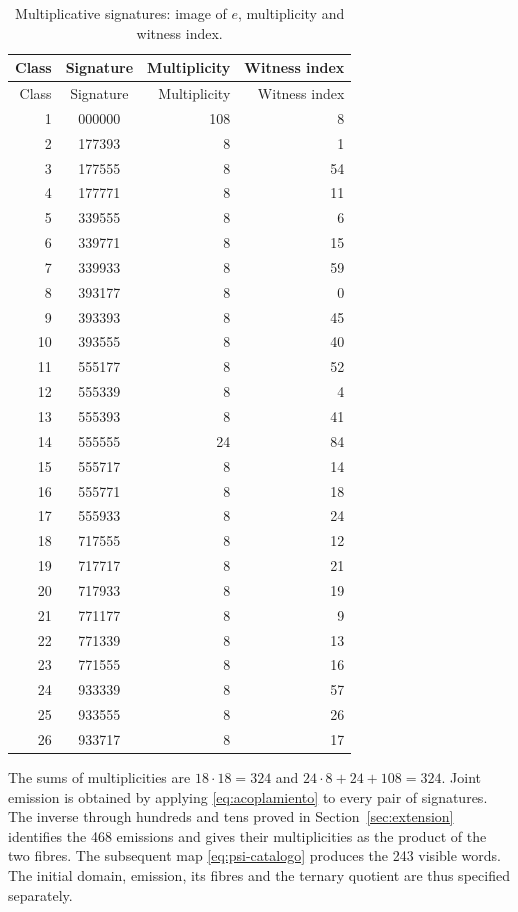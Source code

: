 \begin{longtable}{rcrr}
\caption{Multiplicative signatures: image of \(e\), multiplicity and witness index.}
\label{iv:tabla-firmas-multiplicativas}\\
\toprule
Class & Signature & Multiplicity & Witness index\\
\midrule
\endfirsthead
\toprule
Class & Signature & Multiplicity & Witness index\\
\midrule
\endhead
1&000000&108&8\\
2&177393&8&1\\
3&177555&8&54\\
4&177771&8&11\\
5&339555&8&6\\
6&339771&8&15\\
7&339933&8&59\\
8&393177&8&0\\
9&393393&8&45\\
10&393555&8&40\\
11&555177&8&52\\
12&555339&8&4\\
13&555393&8&41\\
14&555555&24&84\\
15&555717&8&14\\
16&555771&8&18\\
17&555933&8&24\\
18&717555&8&12\\
19&717717&8&21\\
20&717933&8&19\\
21&771177&8&9\\
22&771339&8&13\\
23&771555&8&16\\
24&933339&8&57\\
25&933555&8&26\\
26&933717&8&17\\
\bottomrule
\end{longtable}

The sums of multiplicities are \(18\cdot18=324\) and
\(24\cdot8+24+108=324\). Joint emission is obtained by applying
\eqref{eq:acoplamiento} to every pair of signatures. The inverse through
hundreds and tens proved in Section~\ref{sec:extension} identifies the 468
emissions and gives their multiplicities as the product of the two fibres.
The subsequent map \eqref{eq:psi-catalogo} produces the 243
visible words. The initial domain, emission, its fibres and the ternary
quotient are thus specified separately.

